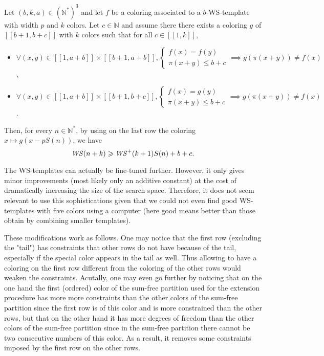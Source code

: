 \begin{proposition}
Let \((b, k, a) \in (\mathbb{N}^*)^3\) and let \(f\) be a coloring associated to a \(b\)-WS-template with width \(p\) and \(k\) colors. Let
\(c \in \mathbb{N}\) and assume there there exists a coloring \(g\) of \([\![b + 1, b + c]\!]\) with \(k\) colors such that for all \(c \in [\![1, k]\!]\),

\begin{itemize}
\item \(\forall (x, y) \in  [\![1, a + b]\!] \times  [\![b + 1, a + b]\!],  \left\{
	\begin{array}{l}
		f(x) = f(y) \\
		\pi(x + y) \leqslant b + c
	\end{array}
	\right. \implies g(\pi(x + y)) \neq f(x)\),
\item \(\forall (x, y) \in  [\![1, a + b]\!] \times  [\![b + 1, b + c]\!], \left\{
	\begin{array}{l}
		f(x) = g(y) \\
		\pi(x + y) \leqslant b + c
	\end{array}
	\right. \implies g(\pi(x + y)) \neq f(x)\).
\end{itemize}

Then, for every \(n \in \mathbb{N}^*\), by using on the last row the coloring \(x \longmapsto g(x - p S(n))\), we have\\
\[ \mathit{WS}(n+k) \geqslant \mathit{WS}^+(k+1) S(n) + b + c.\]
\end{proposition}

The WS-templates can actually be fine-tuned further. However, it only gives minor improvements (most likely only an additive
constant) at the cost of dramatically increasing the size of the search space. Therefore, it does not seem relevant to
use this sophistications given that we could not even find good WS-templates with five colors using a computer (here good
means better than those obtain by combining smaller templates).

\par These modifications work as follows. One may notice that the first row (excluding the "tail") has constraints that other rows
do not have because of the tail, especially if the special color appears in the tail as well. Thus allowing to have a coloring on the
first row different from the coloring of the other rows would weaken the constraints. Acutally, one may even go further by
noticing that on the one hand the first (ordered) color of the sum-free partition used for the extension procedure has more
more constraints than the other colors of the sum-free partition since the first row is of this color and is more constrained than
the other rows, but that on the other hand it has more degrees of freedom than the other colors of the sum-free partition since in
the sum-free partition there cannot be two consecutive numbers of this color. As a result, it removes  some constraints imposed
 by the first row on the other rows.


